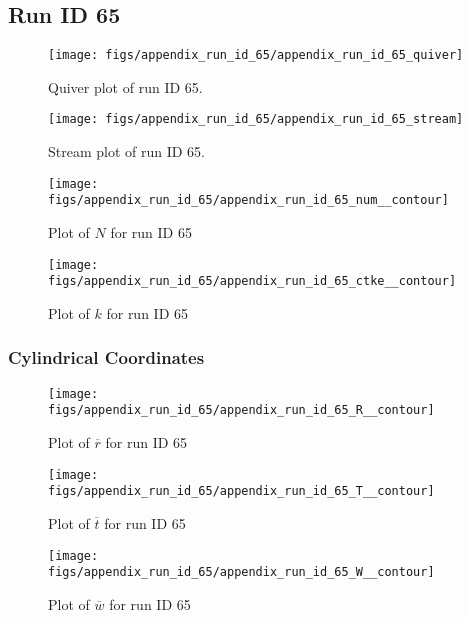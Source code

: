 \subsection{Run ID 65}
\begin{figure}[H]
\centering
\texttt{[image: figs/appendix\_run\_id\_65/appendix\_run\_id\_65\_quiver]}
\caption{Quiver plot of run ID 65.}
\label{fig:appendix_run_id_65_quiver}
\end{figure}


\begin{figure}[H]
\centering
\texttt{[image: figs/appendix\_run\_id\_65/appendix\_run\_id\_65\_stream]}
\caption{Stream plot of run ID 65.}
\label{fig:appendix_run_id_65_stream}
\end{figure}


\begin{figure}[H]
\centering
\texttt{[image: figs/appendix\_run\_id\_65/appendix\_run\_id\_65\_num\_\_contour]}
\caption{Plot of $N$ for run ID 65}
\label{fig:appendix_run_id_65_num__contour}
\end{figure}


\begin{figure}[H]
\centering
\texttt{[image: figs/appendix\_run\_id\_65/appendix\_run\_id\_65\_ctke\_\_contour]}
\caption{Plot of $k$ for run ID 65}
\label{fig:appendix_run_id_65_ctke__contour}
\end{figure}


\subsubsection{Cylindrical Coordinates}
\begin{figure}[H]
\centering
\texttt{[image: figs/appendix\_run\_id\_65/appendix\_run\_id\_65\_R\_\_contour]}
\caption{Plot of $\overline{r}$ for run ID 65}
\label{fig:appendix_run_id_65_R__contour}
\end{figure}


\begin{figure}[H]
\centering
\texttt{[image: figs/appendix\_run\_id\_65/appendix\_run\_id\_65\_T\_\_contour]}
\caption{Plot of $\overline{t}$ for run ID 65}
\label{fig:appendix_run_id_65_T__contour}
\end{figure}


\begin{figure}[H]
\centering
\texttt{[image: figs/appendix\_run\_id\_65/appendix\_run\_id\_65\_W\_\_contour]}
\caption{Plot of $\overline{w}$ for run ID 65}
\label{fig:appendix_run_id_65_W__contour}
\end{figure}


